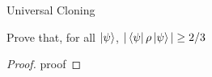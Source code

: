 \begin{solution}{Universal Cloning}\label{ques:x}
    \begin{question}
    Prove that, for all $\ket{\psi}$, $|\bra{\psi}\rho\ket{\psi}|\geq 2/3$
    \end{question}
    \tcblower{}
    \begin{proof}
    proof
    \end{proof}
\end{solution}
 